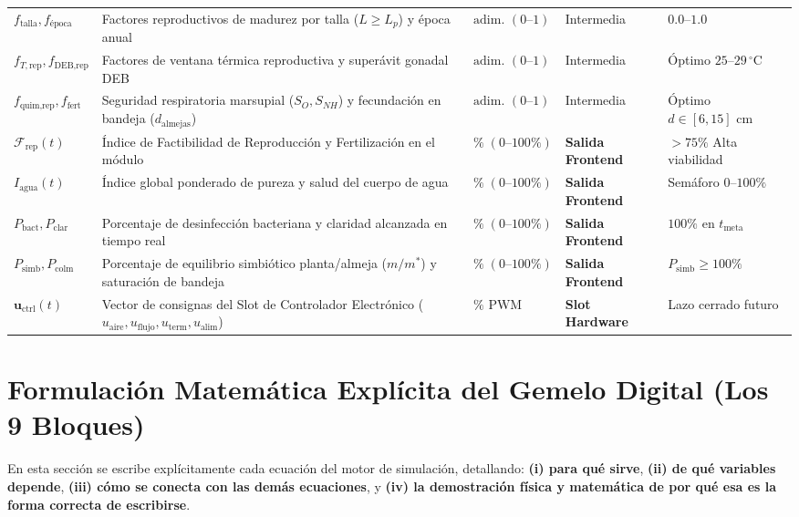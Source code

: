 \documentclass[11pt,letterpaper]{article}
\begin{document}
{\begin{longtable}{p{1.85cm} p{5.95cm} p{2.15cm} p{2.15cm} p{2.55cm}}
$f_{\text{talla}}, f_{\text{época}}$ & Factores reproductivos de madurez por talla ($L \ge L_p$) y época anual & $\text{adim. } (0\text{--}1)$ & Intermedia & $0.0\text{--}1.0$ \\
$f_{T,\text{rep}}, f_{\text{DEB,rep}}$ & Factores de ventana térmica reproductiva y superávit gonadal DEB & $\text{adim. } (0\text{--}1)$ & Intermedia & Óptimo $25\text{--}29\,^\circ\text{C}$ \\
$f_{\text{quim,rep}}, f_{\text{fert}}$ & Seguridad respiratoria marsupial ($S_O, S_{NH}$) y fecundación en bandeja ($d_{\text{almejas}}$) & $\text{adim. } (0\text{--}1)$ & Intermedia & Óptimo $d\in[6,15]\text{ cm}$ \\
$\mathcal{F}_{\text{rep}}(t)$ & Índice de Factibilidad de Reproducción y Fertilización en el módulo & $\% \; (0\text{--}100\%)$ & \textbf{Salida Frontend} & $>75\%$ Alta viabilidad \\
$I_{\text{agua}}(t)$ & Índice global ponderado de pureza y salud del cuerpo de agua & $\% \; (0\text{--}100\%)$ & \textbf{Salida Frontend} & Semáforo $0\text{--}100\%$ \\
$P_{\text{bact}}, P_{\text{clar}}$ & Porcentaje de desinfección bacteriana y claridad alcanzada en tiempo real & $\% \; (0\text{--}100\%)$ & \textbf{Salida Frontend} & $100\%$ en $t_{\text{meta}}$ \\
$P_{\text{simb}}, P_{\text{colm}}$ & Porcentaje de equilibrio simbiótico planta/almeja ($m/m^*$) y saturación de bandeja & $\% \; (0\text{--}100\%)$ & \textbf{Salida Frontend} & $P_{\text{simb}} \ge 100\%$ \\
$\mathbf{u}_{\text{ctrl}}(t)$ & Vector de consignas del Slot de Controlador Electrónico ($u_{\text{aire}}, u_{\text{flujo}}, u_{\text{term}}, u_{\text{alim}}$) & $\% \text{ PWM}$ & \textbf{Slot Hardware} & Lazo cerrado futuro \\
\end{longtable}
}

\newpage
\section{Formulación Matemática Explícita del Gemelo Digital (Los 9 Bloques)}

En esta sección se escribe explícitamente cada ecuación del motor de simulación, detallando: \textbf{(i) para qué sirve}, \textbf{(ii) de qué variables depende}, \textbf{(iii) cómo se conecta con las demás ecuaciones}, y \textbf{(iv) la demostración física y matemática de por qué esa es la forma correcta de escribirse}.
\end{document}
